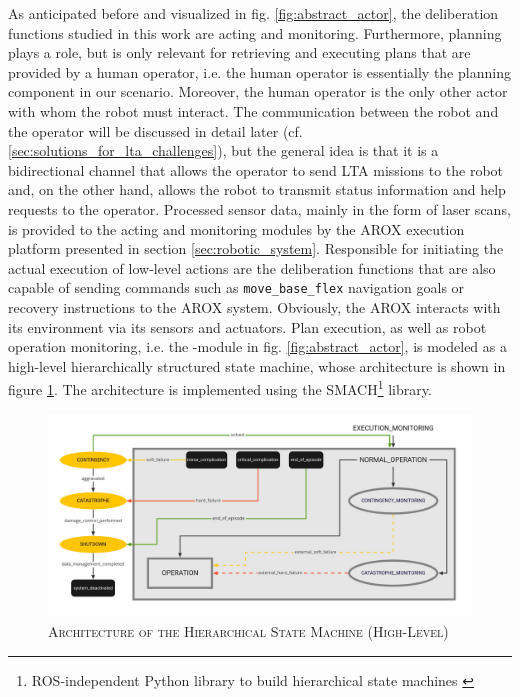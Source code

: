 \documentclass[english, master, utf8]{base/thesis_KBS}
\newcommand{\code}[1]{\colorbox{light-gray}{\texttt{#1}}}
\begin{document}
\noindent
As anticipated before and visualized in fig. \ref{fig:abstract_actor}, the deliberation functions studied in this work are acting and monitoring. Furthermore, planning plays a role,
but is only relevant for retrieving and executing plans that are provided by a human operator, i.e. the human operator is essentially the planning component in our scenario.
Moreover, the human operator is the only other actor with whom the robot must interact. The communication between the robot and the operator will be discussed in detail later (cf.
\ref{sec:solutions_for_lta_challenges}), but the general idea is that it is a bidirectional channel that allows the operator to send LTA missions to the robot and, on the
other hand, allows the robot to transmit status information and help requests to the operator. Processed sensor data, mainly in the form of laser scans, is provided to the
acting and monitoring modules by the AROX execution platform presented in section \ref{sec:robotic_system}. Responsible for initiating the actual execution of low-level actions
are the deliberation functions that are also capable of sending commands such as \code{move\_base\_flex} navigation goals or recovery instructions to the AROX system.
Obviously, the AROX interacts with its environment via its sensors and actuators.\newline
Plan execution, as well as robot operation monitoring, i.e. the -module in fig. \ref{fig:abstract_actor}, is modeled as a high-level hierarchically
structured state machine, whose architecture is shown in figure \ref{fig:high_level_smach}. The architecture is implemented using the SMACH\footnote{ROS-independent Python
library to build hierarchical state machines \cite{smach}} library.
\begin{figure}[H]
    \centering
    \includegraphics[width=\textwidth]{pics/SMACH_high_level.jpg}
    \caption{\textsc{Architecture of the Hierarchical State Machine (High-Level)}}
    \label{fig:high_level_smach}
\end{figure}
\end{document}

